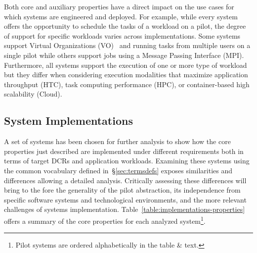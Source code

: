 \documentclass{sig-alternate}
\begin{document}
Both core and auxiliary properties have a direct impact on the use cases for
which \pilot systems are engineered and deployed. For example, while every
\pilot system offers the opportunity to schedule the tasks of a workload on a
pilot, the degree of support for specific workloads varies across
implementations. Some \pilot systems support Virtual Organizations
(VO)~\cite{foster2001} and running tasks from multiple users on a single pilot
while others support jobs using a Message Passing Interface (MPI). Furthermore,
all \pilot systems support the execution of one or more type of workload but
they differ when considering execution modalities that maximize application
throughput (HTC), task computing performance (HPC), or container-based high
scalability (Cloud).




%
\subsection{\pilot System Implementations}
\label{sec:implementations}

A set of \pilot systems has been chosen for further analysis to show how the
core properties just described are implemented under different requirements both
in terms of target DCRs and application workloads. Examining these \pilot
systems using the common vocabulary defined in~\S\ref{sec:termsdefs} exposes
similarities and differences allowing a detailed analysis. Critically assessing
these differences will bring to the fore the generality of the pilot
abstraction, its independence from specific software systems and technological
environments, and the more relevant challenges of \pilot systems implementation.
Table~\ref{table:implementations-properties} offers a summary of the core
properties for each analyzed \pilot system\protect\footnote{Pilot systems are
  ordered alphabetically in the table \& text.}.
\end{document}
